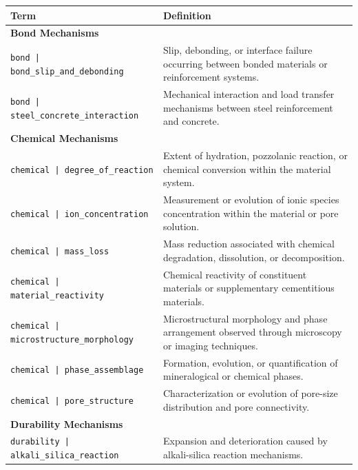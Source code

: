 \documentclass[11pt]{book}
\begin{document}
{\begin{longtable}{p{}p{}}
\hline
\textbf{Term} & \textbf{Definition} \\
\hline
\endhead

\multicolumn{2}{l}{\textbf{Bond Mechanisms}}\\
\hline

\texttt{bond | bond\_slip\_and\_debonding} &
Slip, debonding, or interface failure occurring between bonded materials or reinforcement systems. \\

\texttt{bond | steel\_concrete\_interaction} &
Mechanical interaction and load transfer mechanisms between steel reinforcement and concrete. \\

\hline
\multicolumn{2}{l}{\textbf{Chemical Mechanisms}}\\
\hline

\texttt{chemical | degree\_of\_reaction} &
Extent of hydration, pozzolanic reaction, or chemical conversion within the material system. \\

\texttt{chemical | ion\_concentration} &
Measurement or evolution of ionic species concentration within the material or pore solution. \\

\texttt{chemical | mass\_loss} &
Mass reduction associated with chemical degradation, dissolution, or decomposition. \\

\texttt{chemical | material\_reactivity} &
Chemical reactivity of constituent materials or supplementary cementitious materials. \\

\texttt{chemical | microstructure\_morphology} &
Microstructural morphology and phase arrangement observed through microscopy or imaging techniques. \\

\texttt{chemical | phase\_assemblage} &
Formation, evolution, or quantification of mineralogical or chemical phases. \\

\texttt{chemical | pore\_structure} &
Characterization or evolution of pore-size distribution and pore connectivity. \\

\hline
\multicolumn{2}{l}{\textbf{Durability Mechanisms}}\\
\hline

\texttt{durability | alkali\_silica\_reaction} &
Expansion and deterioration caused by alkali-silica reaction mechanisms. \\


\end{longtable}}
\end{document}
